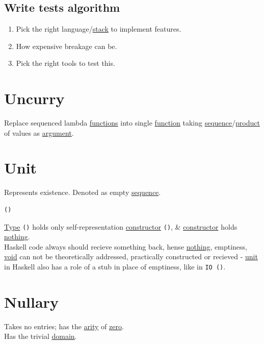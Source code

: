 \documentclass[a4paper,14pt,oneside]{book}
\begin{document}
\section{Write tests algorithm}
\label{sec:org9c7683b}

\begin{enumerate}
\item Pick the right language/\hyperref[orgf88051a]{stack} to implement features.\\
\item How expensive breakage can be.\\
\item Pick the right tools to test this.\\
\end{enumerate}

\chapter{\label{orgb97a08d}Uncurry}
\label{sec:org96c0692}
Replace sequenced lambda \hyperref[orgcfd72f2]{functions} into single \hyperref[org39271b2]{function} taking \hyperref[org8ff2c5c]{sequence}/\hyperref[org72539e1]{product} of values as \hyperref[orgc64e250]{argument}.\\

\chapter{\label{org86a0a0a}Unit}
\label{sec:org0c9acae}
Represents existence. Denoted as empty \hyperref[org8ff2c5c]{sequence}.\\
\begin{verbatim}
()
\end{verbatim}

\hyperref[orgdbcea73]{Type} \texttt{()} holds only self-representation \hyperref[org160093d]{constructor} \texttt{()}, \& \hyperref[org160093d]{constructor} holds \hyperref[org5d7f8ef]{nothing}.\\

Haskell code always should recieve something back, hense \hyperref[org5d7f8ef]{nothing}, emptiness, \hyperref[orge763f9d]{void} can not be theoretically addressed, practically constructed or recieved - \hyperref[org86a0a0a]{unit} in Haskell also has a role of a stub in place of emptiness, like in \texttt{IO ()}.\\

\chapter{\label{orgb1db4d4}Nullary}
\label{sec:orga1183dd}
Takes no entries; has the \hyperref[orgb5b2db1]{arity} of \hyperref[org6c52cc9]{zero}.\\
Has the trivial \hyperref[org2ec54f8]{domain}.\\
\end{document}
